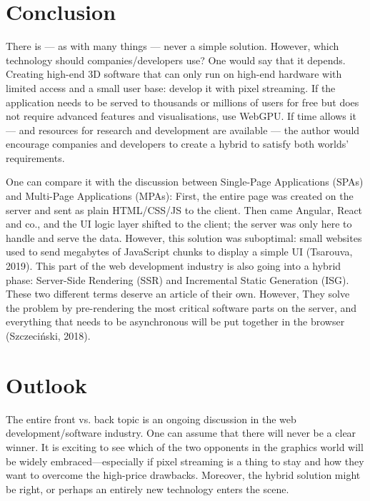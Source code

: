 \documentclass[10pt]{article}
\begin{document}
\begin{sloppypar}
  \section{Conclusion}
  \label{sec:conclusion}

  There is — as with many things — never a simple solution. However, which technology should companies/developers use? One would say that it depends. Creating high-end 3D software that can only run on high-end hardware with limited access and a small user base: develop it with pixel streaming. If the application needs to be served to thousands or millions of users for free but does not require advanced features and visualisations, use WebGPU. If time allows it — and resources for research and development are available — the author would encourage companies and developers to create a hybrid to satisfy both worlds’ requirements.

  One can compare it with the discussion between Single-Page Applications (SPAs) and Multi-Page Applications (MPAs): First, the entire page was created on the server and sent as plain HTML/CSS/JS to the client. Then came Angular, React and co., and the UI logic layer shifted to the client; the server was only here to handle and serve the data. However, this solution was suboptimal: small websites used to send megabytes of JavaScript chunks to display a simple UI (Tsarouva, 2019). This part of the web development industry is also going into a hybrid phase: Server-Side Rendering (SSR) and Incremental Static Generation (ISG). These two different terms deserve an article of their own. However, They solve the problem by pre-rendering the most critical software parts on the server, and everything that needs to be asynchronous will be put together in the browser (Szczeciński, 2018).

  \section{Outlook}
  \label{sec:outlook}

  The entire front vs. back topic is an ongoing discussion in the web development/software industry. One can assume that there will never be a clear winner. It is exciting to see which of the two opponents in the graphics world will be widely embraced—especially if pixel streaming is a thing to stay and how they want to overcome the high-price drawbacks. Moreover, the hybrid solution might be right, or perhaps an entirely new technology enters the scene.


  \pagebreak
  
  

\end{sloppypar}
\end{document}
